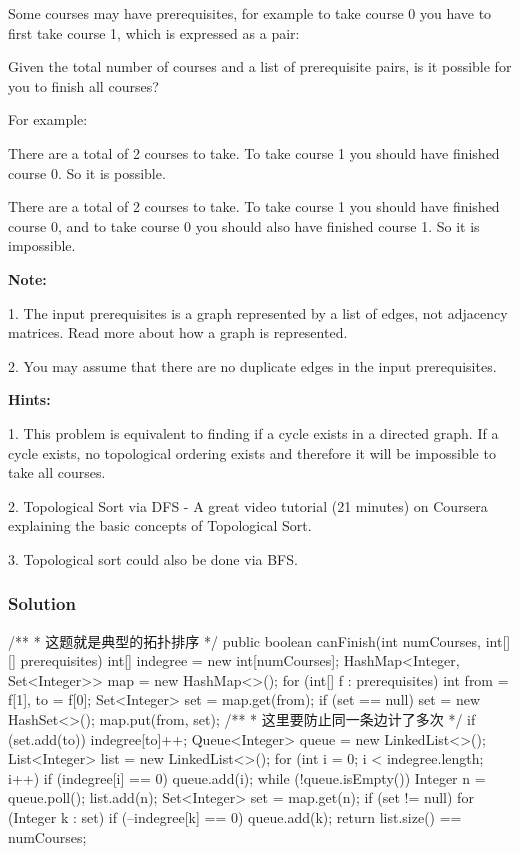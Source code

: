 Some courses may have prerequisites, for example to take course 0 you have to first take course 1, which is expressed as a pair: \code{[0,1]}

Given the total number of courses and a list of prerequisite pairs, is it possible for you to finish all courses?

For example:


There are a total of 2 courses to take. To take course 1 you should have finished course 0. So it is possible.


There are a total of 2 courses to take. To take course 1 you should have finished course 0, and to take course 0 you should also have finished course 1. So it is impossible.

\textbf{Note:}

1. The input prerequisites is a graph represented by a list of edges, not adjacency matrices. Read more about how a graph is represented.

2. You may assume that there are no duplicate edges in the input prerequisites.

\textbf{Hints:}

1. This problem is equivalent to finding if a cycle exists in a directed graph. If a cycle exists, no topological ordering exists and therefore it will be impossible to take all courses.

2. Topological Sort via DFS - A great video tutorial (21 minutes) on Coursera explaining the basic concepts of Topological Sort.

3. Topological sort could also be done via BFS.

\newpage

\subsubsection{Solution}

\begin{Code}
/**
 * 这题就是典型的拓扑排序
 */
public boolean canFinish(int numCourses, int[][] prerequisites) {
    int[] indegree = new int[numCourses];
    HashMap<Integer, Set<Integer>> map = new HashMap<>();
    for (int[] f : prerequisites) {
        int from = f[1], to = f[0];
        Set<Integer> set = map.get(from);
        if (set == null) {
            set = new HashSet<>();
            map.put(from, set);
        }
        /**
         * 这里要防止同一条边计了多次
         */
        if (set.add(to)) {
            indegree[to]++;
        }
    }
    Queue<Integer> queue = new LinkedList<>();
    List<Integer> list = new LinkedList<>();
    for (int i = 0; i < indegree.length; i++) {
        if (indegree[i] == 0) {
            queue.add(i);
        }
    }
    while (!queue.isEmpty()) {
        Integer n = queue.poll();
        list.add(n);
        Set<Integer> set = map.get(n);
        if (set != null) {
            for (Integer k : set) {
                if (--indegree[k] == 0) {
                    queue.add(k);
                }
            }
        }
    }
    return list.size() == numCourses;
}
\end{Code}


